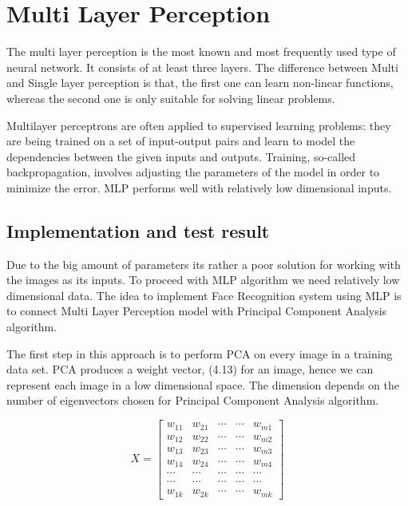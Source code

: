 \chapter{Multi Layer Perception}

The multi layer perception is the most known and most frequently used type of neural network. It consists of at least three layers. The difference between Multi and Single layer perception is that, the first one can learn non-linear functions, whereas the second one is only suitable for solving linear problems. 

Multilayer perceptrons are often applied to supervised learning problems: they are being trained on a set of input-output pairs and learn to model the dependencies between the given inputs and outputs. Training, so-called backpropagation, involves adjusting the parameters of the model in order to minimize the error. MLP performs well with relatively low dimensional inputs. 


\section{Implementation and test result}
Due to the big amount of parameters its rather a poor solution for working with the images as its inputs. To proceed with MLP algorithm we need relatively low dimensional data. The idea to implement Face Recognition system using MLP is to connect Multi Layer Perception model with Principal Component Analysis algorithm. 

The first step in this approach is to perform PCA on every image in a training data set. PCA produces a weight vector, (4.13) for an image, hence we can represent each image in a low dimensional space. The dimension depends on the number of eigenvectors chosen for Principal Component Analysis algorithm. 

\begin{equation}
X =
\left[
\begin{matrix}
w_{11} & w_{21} & \cdots & \cdots & w_{m1}\\
w_{12} & w_{22} & \cdots & \cdots & w_{m2}\\
w_{13} & w_{23} & \cdots & \cdots & w_{m3}\\
w_{14} & w_{24} & \cdots & \cdots & w_{m4}\\
\cdots & \cdots & \cdots & \cdots & \cdots\\
\cdots & \cdots & \cdots & \cdots & \cdots\\
w_{1k} & w_{2k} & \cdots & \cdots & w_{mk}
\end{matrix}
\right]
\end{equation}

